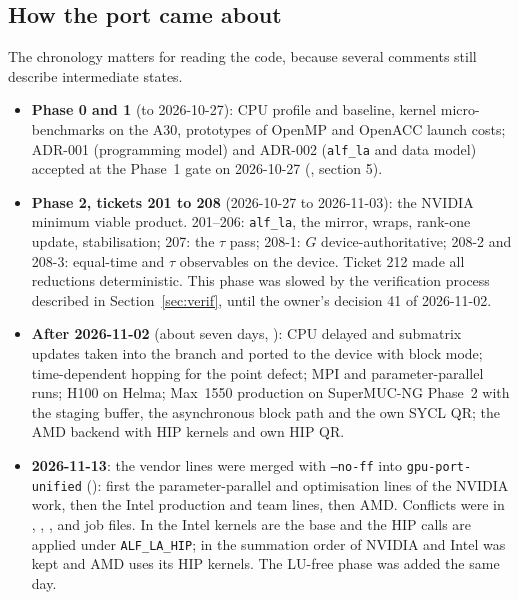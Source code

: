 \subsection{How the port came about}

The chronology matters for reading the code, because several comments still describe intermediate states.
\begin{itemize}
\item \textbf{Phase 0 and 1} (to 2026-10-27): CPU profile and baseline, kernel micro-benchmarks on the A30, prototypes of OpenMP and OpenACC launch costs; ADR-001 (programming model) and ADR-002 (\texttt{alf\_la} and data model) accepted at the Phase~1 gate on 2026-10-27 (, section 5).
\item \textbf{Phase 2, tickets 201 to 208} (2026-10-27 to 2026-11-03): the NVIDIA minimum viable product. 201--206: \texttt{alf\_la}, the mirror, wraps, rank-one update, stabilisation; 207: the $\tau$ pass; 208-1: $G$ device-authoritative; 208-2 and 208-3: equal-time and $\tau$ observables on the device. Ticket 212 made all reductions deterministic. This phase was slowed by the verification process described in Section~\ref{sec:verif}, until the owner's decision 41 of 2026-11-02.
\item \textbf{After 2026-11-02} (about seven days, ): CPU delayed and submatrix updates taken into the branch and ported to the device with block mode; time-dependent hopping for the point defect; MPI and parameter-parallel runs; H100 on Helma; Max~1550 production on SuperMUC-NG Phase~2 with the staging buffer, the asynchronous block path and the own SYCL QR; the AMD backend with HIP kernels and own HIP QR.
\item \textbf{2026-11-13}: the vendor lines were merged with \texttt{--no-ff} into \texttt{gpu-port-unified} (): first the parameter-parallel and optimisation lines of the NVIDIA work, then the Intel production and team lines, then AMD. Conflicts were in , , ,  and job files. In  the Intel kernels are the base and the HIP calls are applied under \texttt{ALF\_LA\_HIP}; in  the summation order of NVIDIA and Intel was kept and AMD uses its HIP kernels. The LU-free phase was added the same day.
\end{itemize}
